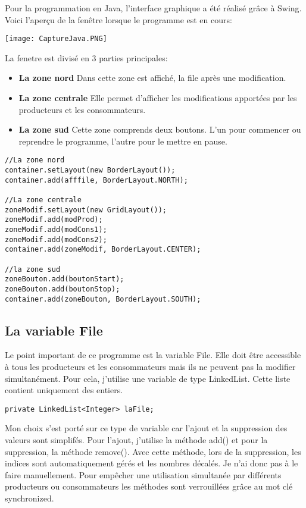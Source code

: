 \documentclass{article}
\begin{document}
Pour la programmation en Java, l'interface graphique a été réalisé grâce à Swing\cite{ref1}. Voici l'aperçu de la fenêtre lorsque le programme est en cours:

\begin{center}
  \texttt{[image: CaptureJava.PNG]}
\end{center}

La fenetre est divisé en 3 parties principales:

\begin{itemize}
\item \textbf{La zone nord} Dans cette zone est affiché, la file après une modification.
\item \textbf{La zone centrale} Elle permet d'afficher les modifications apportées par les producteurs et les consommateurs.
\item \textbf{La zone sud} Cette zone comprends deux boutons. L'un pour commencer ou reprendre le programme, l'autre pour le mettre en pause.
\end{itemize}

\begin{verbatim}
//La zone nord
container.setLayout(new BorderLayout());
container.add(afffile, BorderLayout.NORTH);

//La zone centrale
zoneModif.setLayout(new GridLayout());
zoneModif.add(modProd);
zoneModif.add(modCons1);
zoneModif.add(modCons2);
container.add(zoneModif, BorderLayout.CENTER);

//la zone sud
zoneBouton.add(boutonStart);
zoneBouton.add(boutonStop);
container.add(zoneBouton, BorderLayout.SOUTH);
\end{verbatim}

\subsection{La variable File}

Le point important de ce programme est la variable File. Elle doit être accessible à tous les producteurs et les consommateurs mais ils ne peuvent pas la modifier simultanément. Pour cela, j'utilise une variable de type LinkedList\cite{ref2}. Cette liste contient uniquement des entiers.

\begin{verbatim}
private LinkedList<Integer> laFile;
\end{verbatim}

Mon choix s'est porté sur ce type de variable car l'ajout et la suppression des valeurs sont simplifés. Pour l'ajout, j'utilise la méthode add() et pour la suppression, la méthode remove(). Avec cette méthode, lors de la suppression, les indices sont automatiquement gérés et les nombres décalés. Je n'ai donc pas à le faire manuellement.
Pour empêcher une utilisation simultanée par différents producteurs ou consommateurs les méthodes sont verrouillées grâce au mot clé synchronized.
\end{document}
